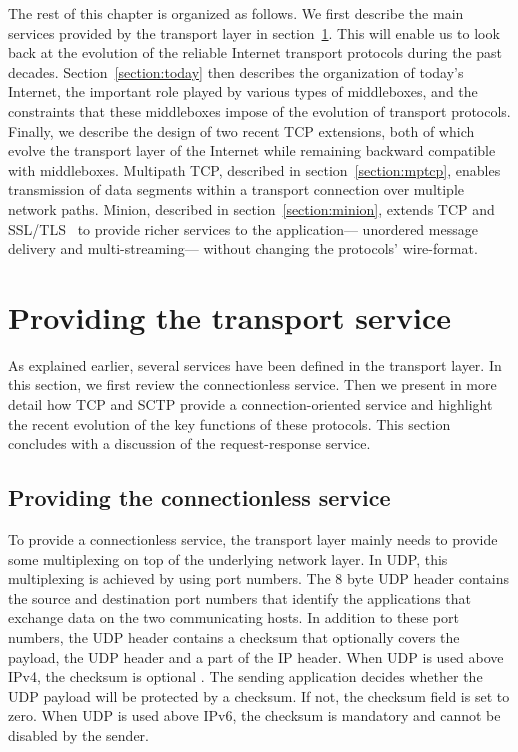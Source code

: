 The rest of this chapter is organized as follows. We first describe
the main services provided by the transport layer in
section~\ref{section:service}. This will enable us to look back at the
evolution of the reliable Internet transport protocols during the past 
decades. Section~\ref{section:today} then describes the organization
of today's Internet, the important role played by various types of
middleboxes, and the constraints that these middleboxes impose of the evolution of
transport protocols. Finally, we describe the design of 
two recent TCP extensions,
both of which
evolve the transport layer of the Internet
while remaining backward compatible with middleboxes.
Multipath TCP, described in
section~\ref{section:mptcp},
enables transmission of data segments within a transport connection
over multiple network paths.
Minion,
described in section~\ref{section:minion},
extends TCP and SSL/TLS~\cite{rfc5246} 
to provide richer services to the application---%
unordered message delivery and multi-streaming---%
without changing the protocols' wire-format.

\section{Providing the transport service}\label{section:service}

As explained earlier, several services have been defined in the
transport layer. In this section, we first review the connectionless
service. Then we present in more detail how TCP and SCTP provide a
connection-oriented service and highlight the recent evolution of the
key functions of these protocols. This section concludes with a
discussion of the request-response service.

\subsection{Providing the connectionless service}

To provide a connectionless service, the transport layer mainly needs
to provide some multiplexing on top of the underlying network
layer. In UDP, this multiplexing is achieved by using port
numbers. The 8 byte UDP header contains the source and destination
port numbers that identify the applications that exchange data
on the two communicating hosts. In addition to these port numbers, the
UDP header contains a checksum that optionally covers the payload, the
UDP header and a part of the IP header. When UDP is used above IPv4, the
checksum is optional \cite{rfc791}. The sending application decides whether the UDP
payload will be protected by a checksum. If not, the checksum field is
set to zero. When UDP is used above IPv6, the checksum is mandatory
and cannot be disabled by the sender.

